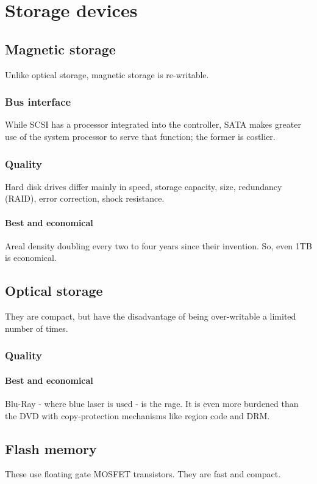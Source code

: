 \documentclass[oneside, article]{memoir}
\begin{document}
\chapter{Storage devices}
\section{Magnetic storage}
Unlike optical storage, magnetic storage is re-writable.

\subsection{Bus interface}
While SCSI has a processor integrated into the controller, SATA makes greater use of the system processor to serve that function; the former is costlier.

\subsection{Quality}
Hard disk drives differ mainly in speed, storage capacity, size, redundancy (RAID), error correction, shock resistance.

\subsubsection{Best and economical}
Areal density doubling every two to four years since their invention. So, even 1TB is economical.

\section{Optical storage}
They are compact, but have the disadvantage of being over-writable a limited number of times.

\subsection{Quality}
\subsubsection{Best and economical}
Blu-Ray - where blue laser is used - is the rage. It is even more burdened than the DVD with copy-protection mechanisms like region code and DRM.

\section{Flash memory}
These use floating gate MOSFET transistors. They are fast and compact.
\end{document}
